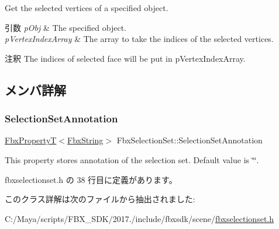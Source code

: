 Get the selected vertices of a specified object. 
\begin{DoxyParams}{引数}
{\em p\+Obj} & The specified object. \\
\hline
{\em p\+Vertex\+Index\+Array} & The array to take the indices of the selected vertices. \\
\hline
\end{DoxyParams}
\begin{DoxyRemark}{注釈}
The indices of selected face will be put in p\+Vertex\+Index\+Array. 
\end{DoxyRemark}


\subsection{メンバ詳解}
\mbox{\label{class_fbx_selection_set_abe27bd368bd6e3df129e808900a72f19}} 
\subsubsection{\texorpdfstring{Selection\+Set\+Annotation}{SelectionSetAnnotation}}
{\footnotesize\ttfamily \hyperlink{class_fbx_property_t}{Fbx\+PropertyT}$<$\hyperlink{class_fbx_string}{Fbx\+String}$>$ Fbx\+Selection\+Set\+::\+Selection\+Set\+Annotation}

This property stores annotation of the selection set. Default value is \char`\"{}\char`\"{}. 

 fbxselectionset.\+h の 38 行目に定義があります。



このクラス詳解は次のファイルから抽出されました\+:\begin{DoxyCompactItemize}
\item 
C\+:/\+Maya/scripts/\+F\+B\+X\+\_\+\+S\+D\+K/2017./include/fbxsdk/scene/\hyperlink{fbxselectionset_8h}{fbxselectionset.\+h}\end{DoxyCompactItemize}
